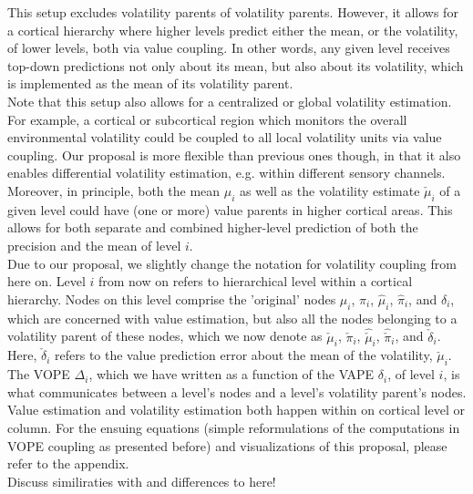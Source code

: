 This setup excludes volatility parents of volatility parents. However, it allows for a cortical hierarchy where higher levels predict either the mean, or the volatility, of lower levels, both via value coupling. In other words, any given level receives top-down predictions not only about its mean, but also about its volatility, which is implemented as the mean of its volatility parent.\\

Note that this setup also allows for a centralized or global volatility estimation. For example, a cortical or subcortical region which monitors the overall environmental volatility could be coupled to all local volatility units via value coupling. Our proposal is more flexible than previous ones \cite{Kanai2015} though, in that it also enables differential volatility estimation, e.g. within different sensory channels. \\

Moreover, in principle, both the mean $\mu_i$ as well as the volatility estimate $\check{\mu}_i$ of a given level could have (one or more) value parents in higher cortical areas. This allows for both separate and combined higher-level prediction of both the precision and the mean of level $i$.\\

Due to our proposal, we slightly change the notation for volatility coupling from here on. Level $i$ from now on refers to hierarchical level within a cortical hierarchy. Nodes on this level comprise the 'original' nodes $\mu_i$, $\pi_i$, $\hat{\mu}_i$, $\hat{\pi}_i$, and $\delta_i$, which are concerned with value estimation, but also all the nodes belonging to a volatility parent of these nodes, which we now denote as $\check{\mu}_i$, $\check{\pi}_i$, $\hat{\check{\mu}}_i$, $\hat{\check{\pi}}_i$, and $\check{\delta}_i$. Here, $\check{\delta}_i$ refers to the value prediction error about the mean of the volatility, $\check{\mu}_i$. \\

The \textsf{VOPE} $\Delta_i$, which we have written as a function of the \textsf{VAPE} $\delta_i$, of level $i$, is what communicates between a level's nodes and a level's volatility parent's nodes. Value estimation and volatility estimation both happen within on cortical level or column. For the ensuing equations (simple reformulations of the computations in \textsf{VOPE} coupling as presented before) and visualizations of this proposal, please refer to the appendix. \\

Discuss similiraties with and differences to \cite{Kanai2015} here!\\

